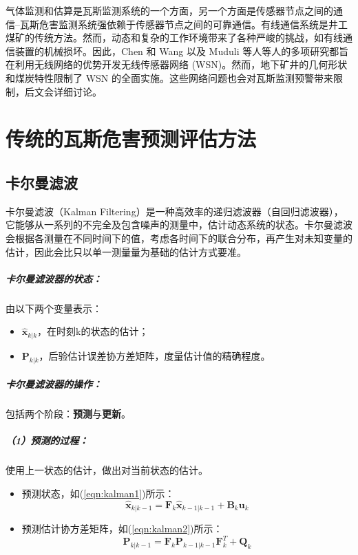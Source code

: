 \documentclass[lang=cn,a4paper,citestyle=gb7714-2015, bibstyle=gb7714-2015]{elegantpaper}
\newcommand{\mycite}[1]{\textsuperscript{\parencite{#1}}}
\begin{document}
    气体监测和估算是瓦斯监测系统的一个方面，另一个方面是传感器节点之间的通信--瓦斯危害监测系统强依赖于传感器节点之间的可靠通信。有线通信系统是井工煤矿的传统方法。然而，动态和复杂的工作环境带来了各种严峻的挑战，如有线通信装置的机械损坏。因此，Chen 和 Wang \mycite{Chen2020} 以及 Muduli 等人\mycite{Muduli2018b}等人的多项研究都旨在利用无线网络的优势开发无线传感器网络 (WSN)。然而，地下矿井的几何形状和煤炭特性限制了 WSN 的全面实施。这些网络问题也会对瓦斯监测预警带来限制，后文会详细讨论。

    \section{传统的瓦斯危害预测评估方法}
    \subsection{卡尔曼滤波}
    卡尔曼滤波（Kalman Filtering）是一种高效率的递归滤波器（自回归滤波器），它能够从一系列的不完全及包含噪声的测量中，估计动态系统的状态。卡尔曼滤波会根据各测量在不同时间下的值，考虑各时间下的联合分布，再产生对未知变量的估计，因此会比只以单一测量量为基础的估计方式要准。


    \subparagraph*{卡尔曼滤波器的状态：} 由以下两个变量表示：

    \begin{itemize}
        \item     ${\hat{\textbf{x}}}_{k|k}$，在时刻k的状态的估计；
        \item     ${\textbf{P}}_{k|k}$，后验估计误差协方差矩阵，度量估计值的精确程度。
    \end{itemize}

    \subparagraph*{卡尔曼滤波器的操作：} 包括两个阶段：\textbf{预测}与\textbf{更新}。

    \subparagraph*{（1）预测的过程：}使用上一状态的估计，做出对当前状态的估计。
    \begin{itemize}
        \item   预测状态，如(\ref{eqn:kalman1})所示：
        \begin{equation}
            {\hat {\textbf {x}}}_{k|k-1}={\textbf {F}}_{k}{\hat {\textbf {x}}}_{k-1|k-1}+{\textbf {B}}_{k}{\textbf {u}}_{k}
            \label{eqn:kalman1}
        \end{equation}
        \item   预测估计协方差矩阵，如(\ref{eqn:kalman2})所示：
        \begin{equation}
            {\textbf {P}}_{k|k-1}={\textbf {F}}_{k}{\textbf {P}}_{k-1|k-1}{\textbf {F}}_{k}^{T}+{\textbf {Q}}_{k}
            \label{eqn:kalman2}
        \end{equation}
    \end{itemize}
\end{document}
